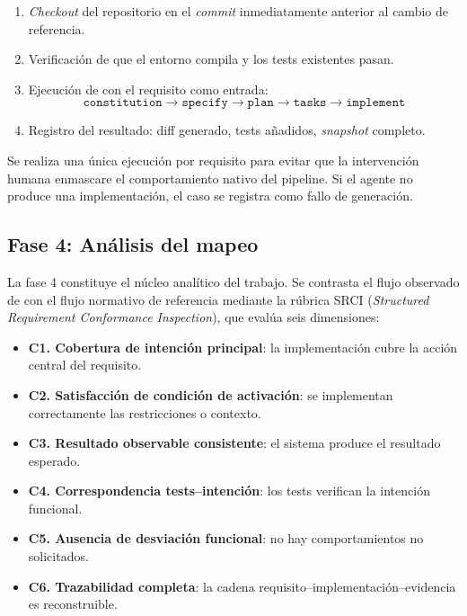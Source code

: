 \begin{enumerate}
    \item \emph{Checkout} del repositorio en el \emph{commit} inmediatamente anterior al cambio de referencia.
    \item Verificaci\'on de que el entorno compila y los tests existentes pasan.
    \item Ejecuci\'on de \speckit{} con el requisito como entrada:
    \[
    \texttt{constitution} \rightarrow \texttt{specify} \rightarrow \texttt{plan} \rightarrow \texttt{tasks} \rightarrow \texttt{implement}
    \]
    \item Registro del resultado: diff generado, tests a\~nadidos, \emph{snapshot} completo.
\end{enumerate}

Se realiza una \'unica ejecuci\'on por requisito para evitar que la intervenci\'on humana enmascare el comportamiento nativo del pipeline. Si el agente no produce una implementaci\'on, el caso se registra como fallo de generaci\'on.

\subsection{Fase 4: An\'alisis del mapeo}

La fase 4 constituye el n\'ucleo anal\'itico del trabajo. Se contrasta el flujo observado de \speckit{} con el flujo normativo de referencia mediante la r\'ubrica SRCI (\emph{Structured Requirement Conformance Inspection}), que eval\'ua seis dimensiones:

\begin{itemize}
    \item \textbf{C1. Cobertura de intenci\'on principal}: la implementaci\'on cubre la acci\'on central del requisito.
    \item \textbf{C2. Satisfacci\'on de condici\'on de activaci\'on}: se implementan correctamente las restricciones o contexto.
    \item \textbf{C3. Resultado observable consistente}: el sistema produce el resultado esperado.
    \item \textbf{C4. Correspondencia tests--intenci\'on}: los tests verifican la intenci\'on funcional.
    \item \textbf{C5. Ausencia de desviaci\'on funcional}: no hay comportamientos no solicitados.
    \item \textbf{C6. Trazabilidad completa}: la cadena requisito--implementaci\'on--evidencia es reconstruible.
\end{itemize}

